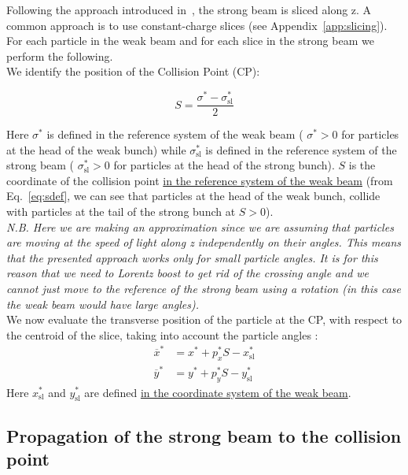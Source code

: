 Following the approach introduced in~\cite{hirata1}, the strong beam is sliced along z. A common approach is to use constant-charge slices (see Appendix~\ref{app:slicing}). For each particle in the weak beam and for each slice in the strong beam we perform the following.
~\\

We identify the position of the Collision Point (CP):

\begin{equation}
S = \frac{\sigma^*-\sigma^*_\textrm{sl}}{2}
\label{eq:sdef}
\end{equation}

Here $\sigma^*$ is defined in the reference system of the weak beam ( $\sigma^*>0$ for particles at the head of the weak bunch) while $\sigma^*_\textrm{sl}$ is defined in the reference system of the strong beam ( $\sigma^*_\textrm{sl}>0$ for particles at the head of the strong bunch). $S$ is the coordinate of the collision point \underline{in the reference system of the weak beam} (from Eq.~\ref{eq:sdef}, we can see that particles at the head of the weak bunch, collide with particles at the tail of the strong bunch at $S>0$). 
~\\

\textit{N.B. Here we are making an approximation since we are assuming that particles are moving at the speed of light along z independently on their angles. This means that the presented approach works only for small particle angles. It is for this reason that we need to Lorentz boost to get rid of the crossing angle and we cannot just move to the reference of the strong beam using a rotation (in this case the weak beam would have large angles).}
~\\

We now evaluate the transverse position of the particle at the CP, with respect to the centroid of the slice, taking into account the particle angles :
\begin{align}
\overline{x}^* &= x^* + p^*_x S - x^*_\textrm{sl}\\
\overline{y}^* &= y^* + p^*_y S - y^*_\textrm{sl}
\end{align}
Here $x^*_\textrm{sl}$ and $y^*_\textrm{sl}$ are defined \underline{in the coordinate system of the weak beam}.
~\\

\subsection{Propagation of the strong beam to the collision point}

